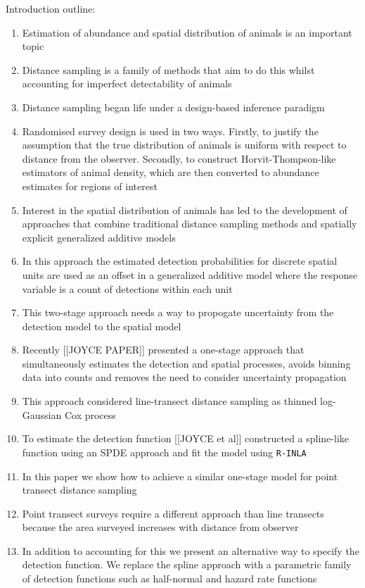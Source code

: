 \documentclass[preprint,12pt]{elsarticle}
\begin{document}
Introduction outline:
\begin{enumerate}
	\item Estimation of abundance and spatial distribution of animals is an important topic
	\item Distance sampling is a family of methods that aim to do this whilst accounting for imperfect detectability of animals
	\item Distance sampling began life under a design-based inference paradigm
	\item Randomised survey design is used in two ways.  Firstly, to justify the assumption that the true distribution of animals is uniform with respect to distance from the observer.  Secondly, to construct Horvit-Thompson-like estimators of animal density, which are then converted to abundance estimates for regions of interest
	\item Interest in the spatial distribution of animals has led to the development of approaches that combine traditional distance sampling methods and spatially explicit generalized additive models
	\item In this approach the estimated detection probabilities for discrete spatial units are used as an offset in a generalized additive model where the response variable is a count of detections within each unit
	\item This two-stage approach needs a way to propogate uncertainty from the detection model to the spatial model
	\item Recently [[JOYCE PAPER]] presented a one-stage approach that simultaneously estimates the detection and spatial processes, avoids binning data into counts and removes the need to consider uncertainty propagation
	\item This approach considered line-transect distance sampling as thinned log-Gaussian Cox process
	\item To estimate the detection function [[JOYCE et al]] constructed a spline-like function using an SPDE approach and fit the model using \texttt{R-INLA}
	\item In this paper we show how to achieve a similar one-stage model for point transect distance sampling
	\item Point transect surveys require a different approach than line transects because the area surveyed increases with distance from observer
	\item In addition to accounting for this we present an alternative way to specify the detection function.  We replace the spline approach with a parametric family of detection functions such as half-normal and hazard rate functions

\end{enumerate}
\end{document}
